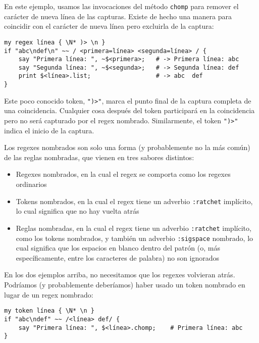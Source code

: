 En este ejemplo, usamos las invocaciones del método {\tt chomp}
para remover el carácter de nueva línea de las capturas. Existe
de hecho una manera para coincidir con el carácter de nueva línea
pero excluirla de la captura:

\begin{verbatim}
my regex línea { \N* )> \n }
if "abc\ndef\n" ~~ / <primera=línea> <segunda=línea> / {
    say "Primera línea: ", ~$<primera>;   # -> Primera línea: abc
    say "Segunda línea: ", ~$<segunda>;   # -> Segunda línea: def
    print $<línea>.list;                  # -> abc  def
}
\end{verbatim}

Este poco conocido token, \verb|")>"|, marca el punto final de
la captura completa de una coincidencia. Cualquier cosa después
del token participará en la coincidencia pero no será 
capturado por el regex nombrado. Similarmente, el token 
\verb|")>"| indica el inicio de la captura.

Los regexes nombrados son solo una forma (y probablemente no la
más común) de las reglas nombradas, que vienen en tres sabores
distintos:

\begin{itemize}
\item Regexes nombrados, en la cual el regex se comporta como
los regexes ordinarios
\item Tokens nombrados,  en la cual el regex tiene un adverbio
{\tt :ratchet} implícito, lo cual significa que no hay vuelta
atrás
\item Reglas nombradas, en la cual el regex tiene un adverbio
{\tt :ratchet} implícito, como los tokens nombrados, y también
un adverbio {\tt :sigspace} nombrado, lo cual significa que los
espacios en blanco dentro del patrón (o, más específicamente, entre
los caracteres de palabra) no son ignorados
\end{itemize}

En los dos ejemplos arriba, no necesitamos que los regexes
volvieran atrás. Podríamos (y probablemente deberíamos)
haber usado un token nombrado en lugar de un regex nombrado:

\begin{verbatim}
my token línea { \N* \n }
if "abc\ndef" ~~ /<línea> def/ {
    say "Primera línea: ", $<línea>.chomp;    # Primera línea: abc
}
\end{verbatim} 

